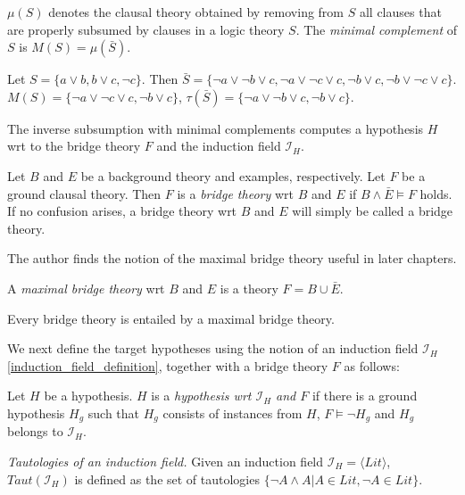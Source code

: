 \begin{defn}
\emph{$\mu(S)$} denotes the clausal theory obtained by removing from $S$ all clauses that are properly subsumed by clauses in a logic theory $S$.
The \emph{minimal complement} of $S$ is $M(S)=\mu(\bar{S})$.
\end{defn}

\begin{exmp}
Let $S=\{a \lor b, b \lor c, \neg c\}$. Then
$\bar{S}=\{\neg a \lor \neg b \lor c, \neg a \lor \neg c \lor c, \neg b \lor c, \neg b \lor \neg c \lor c\}$.
$M(S)=\{\neg a \lor \neg c \lor c, \neg b \lor c\}$,
$\tau(\bar{S})=\{\neg a \lor \neg b \lor c, \neg b \lor c\}$.
\end{exmp}

The inverse subsumption with minimal complements computes a hypothesis $H$ wrt to the bridge theory $F$ and the induction field $\mathcal{I}_H$.

\begin{defn}\label{definition_bridge_theory}
Let $B$ and $E$ be a background theory and examples, respectively.
Let $F$ be a ground clausal theory. Then $F$ is a \emph{bridge theory} wrt $B$ and $E$ if
$B \land \bar{E} \models F$ holds. If no confusion arises, a bridge theory wrt $B$ and $E$ will simply be called a bridge theory.
\end{defn}

The author finds the notion of the maximal bridge theory useful in later chapters.
\begin{defn}\label{maximal_bridge_theory_definition}
A \emph{maximal bridge theory} wrt $B$ and $E$ is a theory $F = B \cup \bar{E}$.
\end{defn}
\begin{remark}
Every bridge theory is entailed by a maximal bridge theory.
\end{remark}

We next define the target hypotheses using the notion of an induction field $\mathcal{I}_H$\ref{induction_field_definition}, together with a bridge theory $F$ as follows:

\begin{defn}\label{definition_hypothesis_wrt_induction_field_bridge_theory}
Let $H$ be a hypothesis. $H$ is a \emph{hypothesis wrt $\mathcal{I}_H$ and $F$} if there is a ground hypothesis $H_g$ such that $H_g$ consists of instances from $H$,
$F \models \neg H_g$ and $H_g$ belongs to $\mathcal{I}_H$.
\end{defn}

\begin{defn}\emph{Tautologies of an induction field.}
Given an induction field $\mathcal{I}_H = \langle Lit \rangle$, $Taut(\mathcal{I}_H)$ is defined
as the set of tautologies $\{\neg A \land A | A \in Lit, \neg A \in Lit\}$.
\end{defn}

